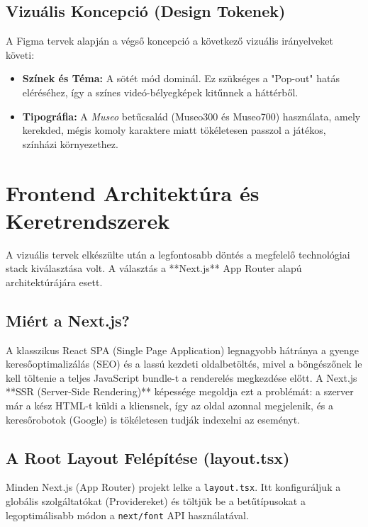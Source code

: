\documentclass[12pt, a4paper]{report}
\begin{document}
\section{Vizuális Koncepció (Design Tokenek)}
A Figma tervek alapján a végső koncepció a következő vizuális irányelveket követi:
\begin{itemize}
    \item \textbf{Színek és Téma:} A sötét mód dominál. Ez szükséges a "Pop-out" hatás eléréséhez, így a színes videó-bélyegképek kitűnnek a háttérből.
    \item \textbf{Tipográfia:} A \textit{Museo} betűcsalád (Museo300 és Museo700) használata, amely kerekded, mégis komoly karaktere miatt tökéletesen passzol a játékos, színházi környezethez.
\end{itemize}

\chapter{Frontend Architektúra és Keretrendszerek}

A vizuális tervek elkészülte után a legfontosabb döntés a megfelelő technológiai stack kiválasztása volt. A választás a **Next.js** App Router alapú architektúrájára esett. 

\section{Miért a Next.js?}
A klasszikus React SPA (Single Page Application) legnagyobb hátránya a gyenge keresőoptimalizálás (SEO) és a lassú kezdeti oldalbetöltés, mivel a böngészőnek le kell töltenie a teljes JavaScript bundle-t a renderelés megkezdése előtt. A Next.js **SSR (Server-Side Rendering)** képessége megoldja ezt a problémát: a szerver már a kész HTML-t küldi a kliensnek, így az oldal azonnal megjelenik, és a keresőrobotok (Google) is tökéletesen tudják indexelni az eseményt.

\section{A Root Layout Felépítése (layout.tsx)}
Minden Next.js (App Router) projekt lelke a \texttt{layout.tsx}. Itt konfiguráljuk a globális szolgáltatókat (Providereket) és töltjük be a betűtípusokat a legoptimálisabb módon a \texttt{next/font} API használatával.
\end{document}
